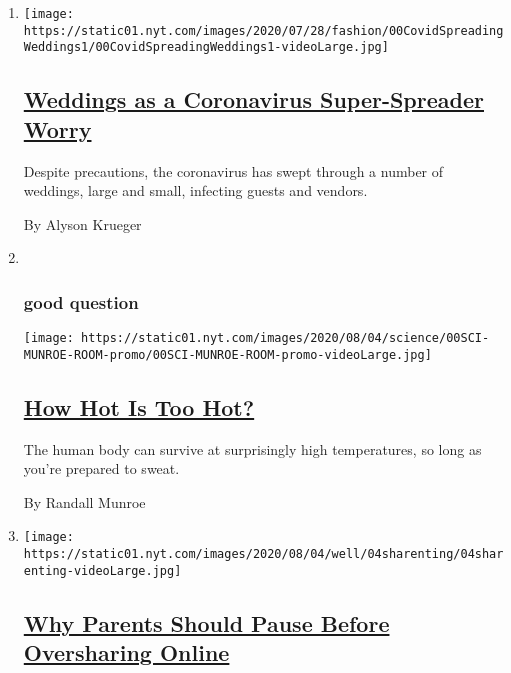 \begin{enumerate}
\def\labelenumi{\arabic{enumi}.}
\item
  \texttt{[image: https://static01.nyt.com/images/2020/07/28/fashion/00CovidSpreadingWeddings1/00CovidSpreadingWeddings1-videoLarge.jpg]}

  \hypertarget{weddings-as-a-coronavirus-super-spreader-worry}{%
  \subsection{\texorpdfstring{\href{/2020/08/04/fashion/weddings/weddings-as-covid-super-spreaders.html}{Weddings
  as a Coronavirus Super-Spreader
  Worry}}{Weddings as a Coronavirus Super-Spreader Worry}}\label{weddings-as-a-coronavirus-super-spreader-worry}}

  Despite precautions, the coronavirus has swept through a number of
  weddings, large and small, infecting guests and vendors.

  By Alyson Krueger
\item ~
  \hypertarget{good-question}{%
  \subsubsection{good question}\label{good-question}}

  \texttt{[image: https://static01.nyt.com/images/2020/08/04/science/00SCI-MUNROE-ROOM-promo/00SCI-MUNROE-ROOM-promo-videoLarge.jpg]}

  \hypertarget{how-hot-is-too-hot}{%
  \subsection{\texorpdfstring{\href{/2020/08/04/science/randall-munroe-xkcd-temperature.html}{How
  Hot Is Too Hot?}}{How Hot Is Too Hot?}}\label{how-hot-is-too-hot}}

  The human body can survive at surprisingly high temperatures, so long
  as you're prepared to sweat.

  By Randall Munroe
\item
  \texttt{[image: https://static01.nyt.com/images/2020/08/04/well/04sharenting/04sharenting-videoLarge.jpg]}

  \hypertarget{why-parents-should-pause-before-oversharing-online}{%
  \subsection{\texorpdfstring{\href{/2020/08/04/well/family/parents-social-media-privacy.html}{Why
  Parents Should Pause Before Oversharing
  Online}}{Why Parents Should Pause Before Oversharing Online}}\label{why-parents-should-pause-before-oversharing-online}}


\end{enumerate}

